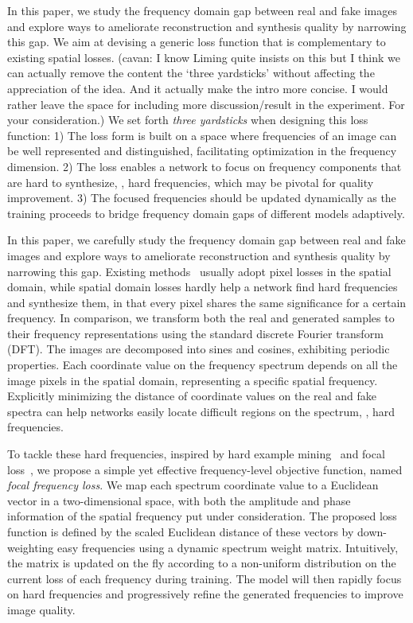 \documentclass[10pt,twocolumn,letterpaper]{article}
\newcommand{\cavan}[1]{{\color{red}(cavan: {#1})}} \newcommand{\liming}[1]{{\color{blue}{#1}}} \newcommand{\daibo}[1]{{\color{Orange}(daibo: {#1})}} \newcommand{\wayne}[1]{{\color{OliveGreen}(wayne: {#1})}} \newcommand{\misscite}{\textcolor{red}{[C]~}}
\begin{document}
In this paper, we study the frequency domain gap between real and fake images and explore ways to ameliorate reconstruction and synthesis quality by narrowing this gap.
We aim at devising a generic loss function that is complementary to existing spatial losses.
\cavan{I know Liming quite insists on this but I think we can actually remove the content the `three yardsticks' without affecting the appreciation of the idea. And it actually make the intro more concise. I would rather leave the space for including more discussion/result in the experiment. For your consideration.}
We set forth \textit{three yardsticks} when designing this loss function:
1) The loss form is built on a space where frequencies of an image can be well represented and distinguished, facilitating optimization in the frequency dimension.
2) The loss enables a network to focus on frequency components that are hard to synthesize, \ie, hard frequencies, which may be pivotal for quality improvement.
3) The focused frequencies should be updated dynamically as the training proceeds to bridge frequency domain gaps of different models adaptively.
\fi



In this paper, we carefully study the frequency domain gap between real and fake images and explore ways to ameliorate reconstruction and synthesis quality by narrowing this gap.
Existing methods~\cite{vae,pix2pix,SPADE} usually adopt pixel losses in the spatial domain,
while spatial domain losses hardly help a network find hard frequencies and synthesize them, in that every pixel shares the same significance for a certain frequency.
In comparison, we transform both the real and generated samples to their frequency representations using the standard discrete Fourier transform (DFT). The images are decomposed into sines and cosines, exhibiting periodic properties. Each coordinate value on the frequency spectrum depends on all the image pixels in the spatial domain, representing a specific spatial frequency.
Explicitly minimizing the distance of coordinate values on the real and fake spectra can help networks easily locate difficult regions on the spectrum, \ie, hard frequencies.


To tackle these hard frequencies, inspired by hard example mining~\cite{hempartmodel,ohem} and focal loss~\cite{focalloss}, we propose a simple yet effective frequency-level objective function, named \textit{focal frequency loss}.
We map each spectrum coordinate value to a Euclidean vector in a two-dimensional space, with both the amplitude and phase information of the spatial frequency put under consideration.
The proposed loss function is defined by the scaled Euclidean distance of these vectors by down-weighting easy frequencies using a dynamic spectrum weight matrix. Intuitively, the matrix is updated on the fly according to a non-uniform distribution on the current loss of each frequency during training.
The model will then rapidly focus on hard frequencies and progressively refine the generated frequencies to improve image quality.
\end{document}
